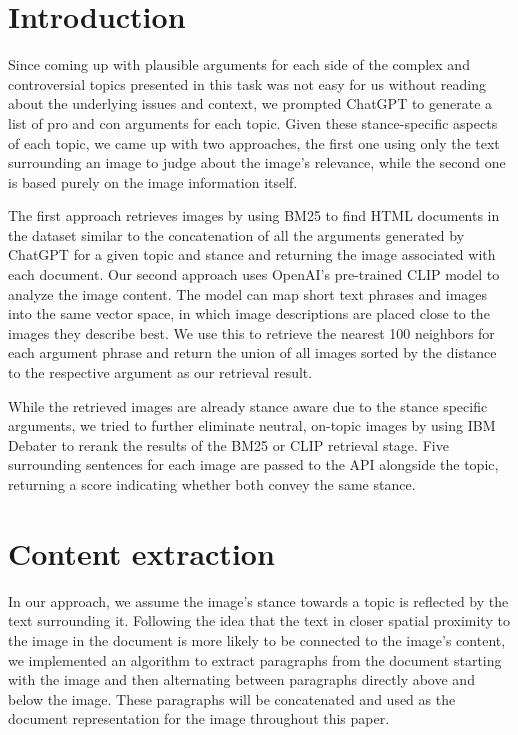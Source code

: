 \documentclass[
]{ceurart}
\begin{document}
\maketitle

\section{Introduction}

Since coming up with plausible arguments for each side of the complex and controversial topics presented in this task was not easy for us without reading about the underlying issues and context, we prompted ChatGPT to generate a list of pro and con arguments for each topic. Given these stance-specific aspects of each topic, we came up with two approaches, the first one using only the text surrounding an image to judge about the image's relevance, while the second one is based purely on the image information itself.

The first approach retrieves images by using BM25 to find HTML documents in the dataset similar to the concatenation of all the arguments generated by ChatGPT for a given topic and stance and returning the image associated with each document. Our second approach uses OpenAI's pre-trained CLIP model to analyze the image content. The model can map short text phrases and images into the same vector space, in which image descriptions are placed close to the images they describe best. We use this to retrieve the nearest 100 neighbors for each argument phrase and return the union of all images sorted by the distance to the respective argument as our retrieval result.

While the retrieved images are already stance aware due to the stance specific arguments, we tried to further eliminate neutral, on-topic images by using IBM Debater to rerank the results of the BM25 or CLIP retrieval stage. Five surrounding sentences for each image are passed to the API alongside the topic, returning a score indicating whether both convey the same stance.

\section{Content extraction} \label{content-extraction}

In our approach, we assume the image's stance towards a topic is reflected by the text surrounding it. Following the idea that the text in closer spatial proximity to the image in the document is more likely to be connected to the image's content, we implemented an algorithm to extract paragraphs from the document starting with the image and then alternating between paragraphs directly above and below the image. These paragraphs will be concatenated and used as the document representation for the image throughout this paper.
\end{document}
